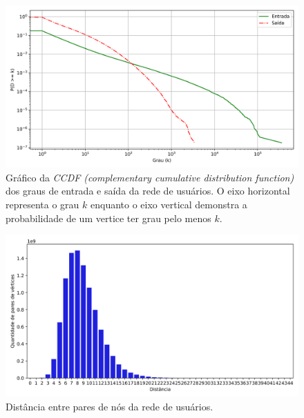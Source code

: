 \begin{figure}[h]
\begin{center} {
    \begin{center}
    \includegraphics[scale=0.65]{images/graph_ccdf.png}
    \caption{Gráfico da \textit{CCDF (complementary cumulative distribution function)}
             dos graus de entrada e saída da rede de usuários.
             O eixo horizontal representa o grau $k$ enquanto o eixo vertical
             demonstra a probabilidade de um vertice ter grau pelo menos $k$.}
    \label{fig:graph_ccdf}
    \end{center}
}
\end{center}
\end{figure}

\begin{figure}[h]
\begin{center} {
    \begin{center}
    \includegraphics[scale=0.65]{images/graph_distance.png}
    \caption{Distância entre pares de nós da rede de usuários.}
    \label{fig:graph_distance}
    \end{center}
}
\end{center}
\end{figure}

